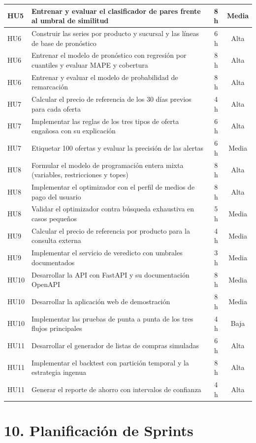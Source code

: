 \documentclass[
11pt, %
]{charter}
\begin{document}
\begin{longtable}{@{}|p{1.3cm}|p{9.3cm}|c|c|@{}}
HU5 & Entrenar y evaluar el clasificador de pares frente al umbral de similitud & 8 h & Media \\ \hline
HU6 & Construir las series por producto y sucursal y las líneas de base de pronóstico & 6 h & Alta \\ \hline
HU6 & Entrenar el modelo de pronóstico con regresión por cuantiles y evaluar MAPE y cobertura & 8 h & Alta \\ \hline
HU6 & Entrenar y evaluar el modelo de probabilidad de remarcación & 8 h & Alta \\ \hline
HU7 & Calcular el precio de referencia de los 30 días previos para cada oferta & 4 h & Alta \\ \hline
HU7 & Implementar las reglas de los tres tipos de oferta engañosa con su explicación & 6 h & Alta \\ \hline
HU7 & Etiquetar 100 ofertas y evaluar la precisión de las alertas & 6 h & Media \\ \hline
HU8 & Formular el modelo de programación entera mixta (variables, restricciones y topes) & 8 h & Alta \\ \hline
HU8 & Implementar el optimizador con el perfil de medios de pago del usuario & 8 h & Alta \\ \hline
HU8 & Validar el optimizador contra búsqueda exhaustiva en casos pequeños & 5 h & Media \\ \hline
HU9 & Calcular el precio de referencia por producto para la consulta externa & 4 h & Media \\ \hline
HU9 & Implementar el servicio de veredicto con umbrales documentados & 3 h & Media \\ \hline
HU10 & Desarrollar la API con FastAPI y su documentación OpenAPI & 8 h & Media \\ \hline
HU10 & Desarrollar la aplicación web de demostración & 8 h & Media \\ \hline
HU10 & Implementar las pruebas de punta a punta de los tres flujos principales & 4 h & Baja \\ \hline
HU11 & Desarrollar el generador de listas de compras simuladas & 6 h & Alta \\ \hline
HU11 & Implementar el backtest con partición temporal y la estrategia ingenua & 8 h & Alta \\ \hline
HU11 & Generar el reporte de ahorro con intervalos de confianza & 4 h & Alta \\ \hline
\end{longtable}

\section{10. Planificación de Sprints}
\label{sec:sprints}
\end{document}

